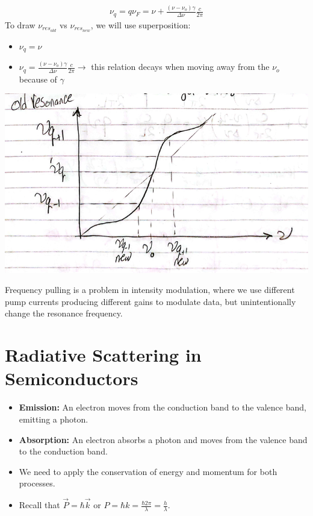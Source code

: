 \documentclass[11pt]{article}
\begin{document}
\begin{align*}
    \nu_q = q \nu_F = \nu + \frac{(\nu - \nu_o) \gamma}{\Delta \nu} \frac{c}{2 \pi}
\end{align*}
To draw $\nu_{res_{old}}$ vs $\nu_{res_{new}}$, we will use superposition:
\begin{itemize}
    \item $\nu_q = \nu$
    \item $\nu_q = \frac{(\nu - \nu_o) \gamma}{\Delta \nu} \frac{c}{2 \pi} \rightarrow$ this relation decays when moving away from the $\nu_o$ because of $\gamma$
\end{itemize}
\begin{center}
    \includegraphics[scale=0.8]{3.png}
\end{center}
Frequency pulling is a problem in intensity modulation, where we use different pump currents producing different gains to modulate data, but unintentionally change the resonance frequency.

\section{Radiative Scattering in Semiconductors}
\begin{itemize}
    \item \textbf{Emission:} An electron moves from the conduction band to the valence band, emitting a photon.
    \item \textbf{Absorption:} An electron absorbs a photon and moves from the valence band to the conduction band.
    \item We need to apply the conservation of energy and momentum for both processes. 
    \item Recall that $\vec{P} = \hbar \vec{k}$ or $P = \hbar k = \frac{\hbar 2 \pi}{\lambda} = \frac{h}{\lambda}$.
\end{itemize}
\end{document}
